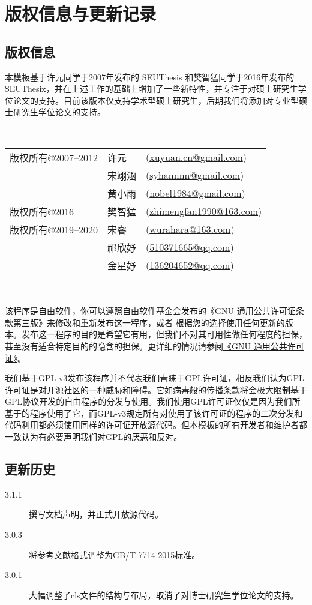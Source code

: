\chapter{版权信息与更新记录}
\label{chp:version_license}

\section{版权信息}

本模板基于许元同学于2007年发布的 SEUThesis 和樊智猛同学于2016年发布的 SEUThesix，并在上述工作的基础上增加了一些新特性，并专注于对硕士研究生学位论文的支持。目前该版本仅支持学术型硕士研究生，后期我们将添加对专业型硕士研究生学位论文的支持。

~

\begin{tabular}{lll}
版权所有\copyright 2007--2012    & 许元      &(\url{xuyuan.cn@gmail.com})\\
                                & 宋翊涵    &(\url{syhannnn@gmail.com})\\
                                & 黄小雨   & (\url{nobel1984@gmail.com})\\
版权所有\copyright 2016          & 樊智猛   &(\url{zhimengfan1990@163.com})\\
版权所有\copyright 2019--2020    & 宋睿       &(\url{wurahara@163.com})\\
                                & 祁欣妤     &(\url{510371665@qq.com})\\
                                & 金星妤    &(\url{136204652@qq.com})\\
\end{tabular}

~

该程序是自由软件，你可以遵照自由软件基金会发布的《GNU 通用公共许可证条款第三版》来修改和重新发布这一程序，或者 根据您的选择使用任何更新的版本。发布这一程序的目的是希望它有用，但我们不对其可用性做任何程度的担保，甚至没有适合特定目的的隐含的担保。更详细的情况请参阅\href{http://www.gnu.org/licenses/gpl.html}{《GNU 通用公共许可证》}。

我们基于GPL-v3发布该程序并不代表我们青睐于GPL许可证，相反我们认为GPL许可证是对开源社区的一种威胁和障碍。它如病毒般的传播条款将会极大限制基于GPL协议开发的自由程序的分发与使用。我们使用GPL许可证仅仅是因为我们所基于的程序使用了它，而GPL-v3规定所有对使用了该许可证的程序的二次分发和代码利用都必须使用同样的许可证开放源代码。但本模板的所有开发者和维护者都一致认为有必要声明我们对GPL的厌恶和反对。

\section{更新历史}

\begin{description}
  \item[3.1.1] 撰写文档声明，并正式开放源代码。
  \item[3.0.3] 将参考文献格式调整为GB/T 7714-2015标准。
  \item[3.0.1] 大幅调整了cls文件的结构与布局，取消了对博士研究生学位论文的支持。
\end{description}
